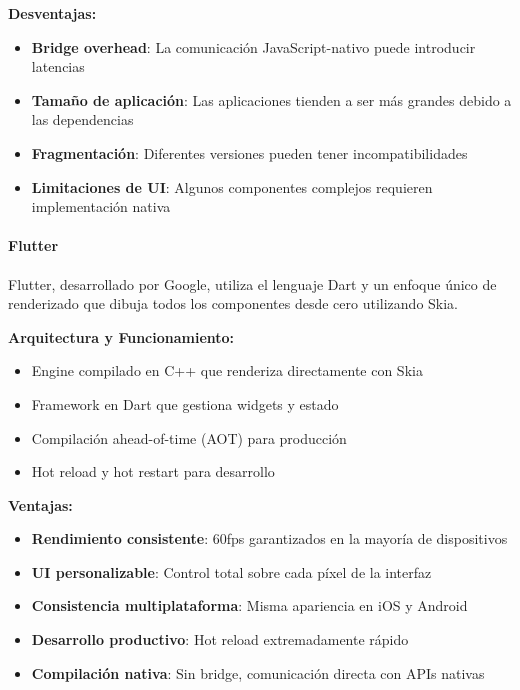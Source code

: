 \textbf{Desventajas:}
\begin{itemize}
    \item \textbf{Bridge overhead}: La comunicación JavaScript-nativo puede introducir latencias
    \item \textbf{Tamaño de aplicación}: Las aplicaciones tienden a ser más grandes debido a las dependencias
    \item \textbf{Fragmentación}: Diferentes versiones pueden tener incompatibilidades
    \item \textbf{Limitaciones de UI}: Algunos componentes complejos requieren implementación nativa
\end{itemize}

\paragraph{Flutter}

Flutter, desarrollado por Google, utiliza el lenguaje Dart y un enfoque único de renderizado que dibuja todos los componentes desde cero utilizando Skia.

\textbf{Arquitectura y Funcionamiento:}
\begin{itemize}
    \item Engine compilado en C++ que renderiza directamente con Skia
    \item Framework en Dart que gestiona widgets y estado
    \item Compilación ahead-of-time (AOT) para producción
    \item Hot reload y hot restart para desarrollo
\end{itemize}

\textbf{Ventajas:}
\begin{itemize}
    \item \textbf{Rendimiento consistente}: 60fps garantizados en la mayoría de dispositivos
    \item \textbf{UI personalizable}: Control total sobre cada píxel de la interfaz
    \item \textbf{Consistencia multiplataforma}: Misma apariencia en iOS y Android
    \item \textbf{Desarrollo productivo}: Hot reload extremadamente rápido
    \item \textbf{Compilación nativa}: Sin bridge, comunicación directa con APIs nativas
\end{itemize}

